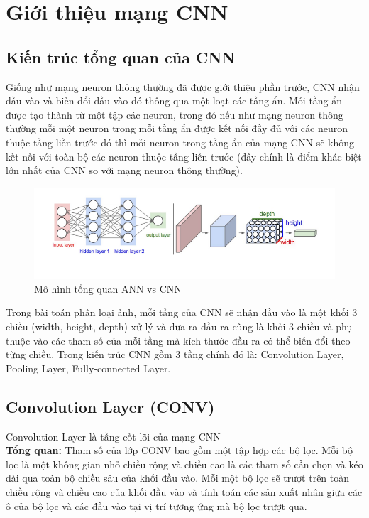 \documentclass[a4paper,12pt]{report}
\begin{document}
\chapter{Giới thiệu mạng CNN}\label{chap_CNN}
\section{Kiến trúc tổng quan của CNN}\label{sec_intro_cnn}
Giống như mạng neuron thông thường đã được giới thiệu phần trước, CNN nhận đầu vào và biến đổi đầu vào đó thông qua một loạt các tầng ẩn. Mỗi tầng ẩn được tạo thành từ một tập các neuron, trong đó nếu như mạng neuron thông thường mỗi một neuron trong mỗi tầng ẩn được kết nối đầy đủ với các neuron thuộc tầng liền trước đó thì mỗi neuron trong tầng ẩn của mạng CNN sẽ không kết nối với toàn bộ các neuron thuộc tầng liền trước (đây chính là điểm khác biệt lớn nhất của CNN so với mạng neuron thông thường).
\begin{figure}[H]
\includegraphics[scale=0.7]{img1.png}
\caption{Mô hình tổng quan ANN vs CNN}
\end{figure}
Trong bài toán phân loại ảnh, mỗi tầng của CNN sẽ nhận đầu vào là một khối 3 chiều (width, height, depth) xử lý và đưa ra đầu ra cũng là khối 3 chiều và phụ thuộc vào các tham số của mỗi tầng mà kích thước đầu ra có thể biến đổi theo từng chiều. Trong kiến trúc CNN gồm 3 tầng chính đó là: Convolution Layer, Pooling Layer, Fully-connected Layer.

\section{Convolution Layer (CONV)}\label{sec_intro_conv}
Convolution Layer là tầng cốt lõi của mạng CNN \\ 

\textbf{Tổng quan:} Tham số của lớp CONV bao gồm một tập hợp các bộ lọc. Mỗi bộ lọc là một không gian nhỏ chiều rộng và chiều cao là các tham số cần chọn và kéo dài qua toàn bộ chiều sâu của khối đầu vào. Mỗi một bộ lọc sẽ trượt trên toàn chiều rộng và chiều cao của khối đầu vào và tính toán các sản xuất nhân giữa các ô của bộ lọc và các đầu vào tại vị trí tương ứng mà bộ lọc trượt qua. \\ 
\end{document}
